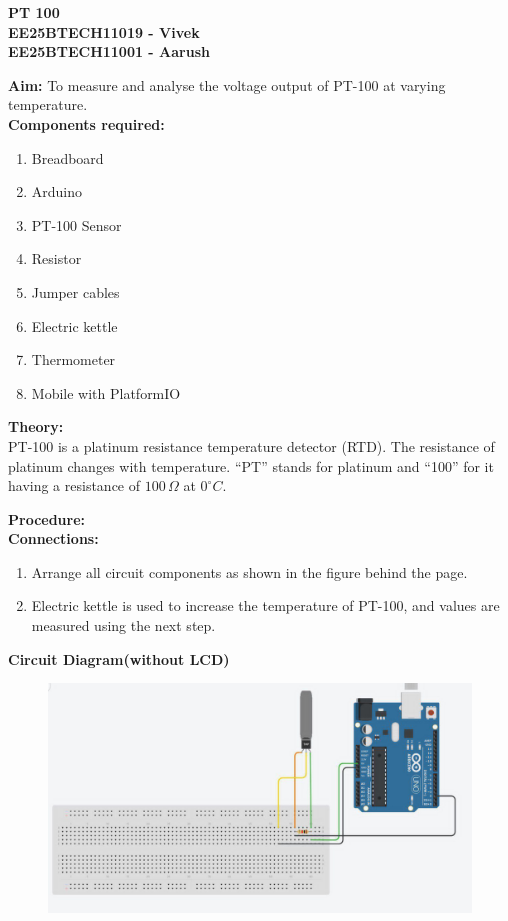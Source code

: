 \documentclass[12pt,a4paper]{article}
\begin{document}
\begin{center}
    \Large \textbf{PT 100} \\[10pt]
    \normalsize
    \textbf{EE25BTECH11019 - Vivek} \\
    \textbf{EE25BTECH11001 - Aarush}
\end{center}

\vspace{1cm}

\noindent \textbf{Aim:} To measure and analyse the voltage output of PT-100 at varying temperature. \\[10pt]

\noindent \textbf{Components required:}
\begin{enumerate}[label=\arabic*.]
    \item Breadboard
    \item Arduino
    \item PT-100 Sensor
    \item Resistor
    \item Jumper cables
    \item Electric kettle
    \item Thermometer
    \item Mobile with PlatformIO
\end{enumerate}

\vspace{8pt}

\noindent \textbf{Theory:} \\
PT-100 is a platinum resistance temperature detector (RTD). The resistance of platinum changes with temperature. ``PT'' stands for platinum and ``100'' for it having a resistance of $100\,\Omega$ at $0^\circ C$.

\vspace{10pt}

\noindent \textbf{Procedure:}\\[4pt]
\textbf{Connections:}
\begin{enumerate}[label=\arabic*.]
    \item Arrange all circuit components as shown in the figure behind the page.
    \item Electric kettle is used to increase the temperature of PT-100, and values are measured using the next step.
\end{enumerate}
\newpage
\noindent \textbf{Circuit Diagram(without LCD)} \\

\begin{figure}[h!]
 \centering
 \includegraphics[width=0.75\columnwidth]{arduino.jpg}
\end{figure}
\end{document}
